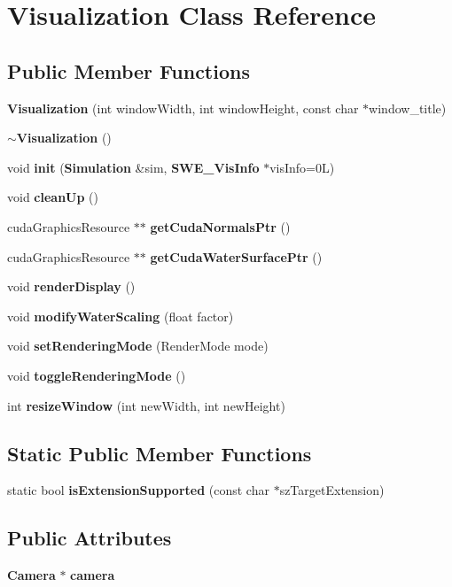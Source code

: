 \section{Visualization Class Reference}
\label{classVisualization}
\subsection*{Public Member Functions}
\begin{DoxyCompactItemize}
\item 
{\bf Visualization} (int window\-Width, int window\-Height, const char $\ast$window\-\_\-title)
\item 
{\bf $\sim$\-Visualization} ()
\item 
void {\bf init} ({\bf Simulation} \&sim, {\bf S\-W\-E\-\_\-\-Vis\-Info} $\ast$vis\-Info=0\-L)
\item 
void {\bf clean\-Up} ()
\item 
cuda\-Graphics\-Resource $\ast$$\ast$ {\bf get\-Cuda\-Normals\-Ptr} ()
\item 
cuda\-Graphics\-Resource $\ast$$\ast$ {\bf get\-Cuda\-Water\-Surface\-Ptr} ()
\item 
void {\bf render\-Display} ()
\item 
void {\bfseries modify\-Water\-Scaling} (float factor)\label{classVisualization_a8c985ef294e7d35ab65257c30f757807}

\item 
void {\bf set\-Rendering\-Mode} (Render\-Mode mode)
\item 
void {\bf toggle\-Rendering\-Mode} ()
\item 
int {\bf resize\-Window} (int new\-Width, int new\-Height)
\end{DoxyCompactItemize}
\subsection*{Static Public Member Functions}
\begin{DoxyCompactItemize}
\item 
static bool {\bf is\-Extension\-Supported} (const char $\ast$sz\-Target\-Extension)
\end{DoxyCompactItemize}
\subsection*{Public Attributes}
\begin{DoxyCompactItemize}
\item 
{\bf Camera} $\ast$ {\bfseries camera}\label{classVisualization_a7013e42778d25e78c1d45724895b8442}

\end{DoxyCompactItemize}


